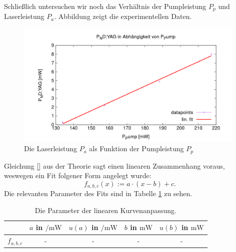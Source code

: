 \documentclass[../../../main.tex]{subfiles}
\begin{document}
    Schließlich untersuchen wir noch das Verhältnis der Pumpleistung $P_p$ und Laserleistung $P_a$. Abbildung zeigt die experimentellen Daten.

    \begin{figure}[H]
        \centering
        \includegraphics[width=11cm]{../../Bilddateien/5/P(NDYAG)overP(Pump).png}
        \caption{Die Laserleistung $P_a$ als Funktion der Pumpleistung $P_p$}
        \label{fig:PumpLaserLeistung}
    \end{figure}

    Gleichung \eqref{} aus der Theorie sagt einen linearen Zusammenhang voraus, weswegen ein Fit folgener Form angelegt wurde:
    \[
        f_{a,b,c}(x) := a\cdot (x - b) + c.      
    \]
    Die relevanten Parameter des Fits sind in Tabelle \ref{tab:PumpLaserLeistungFitParameter} zu sehen.

    \begin{table}[H]
        \centering
        \begin{tabular}{c|cc |cc}
            \hline
            & $a$ in $\si{\per\m\W}$ & $u(a)$ in $\si{\per\m\W}$ & $b$ in $\si{\m\W}$ & $u(b)$ in $\si{\m\W}$\\
            \hline\hline
            $f_{a, b, c}$ & - & - & - & -
        \end{tabular}
        \caption{Die Parameter der linearen Kurvenanpassung.}
        \label{tab:PumpLaserLeistungFitParameter}
    \end{table}
\end{document}
